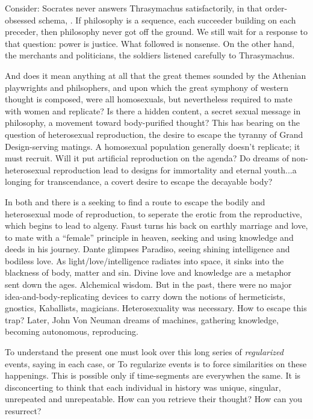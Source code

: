 \documentclass[11pt,twoside,draft]{memoir}
\begin{document}
Consider: Socrates never answers Thrasymachus satisfactorily, in that order-obsessed
schema, . If philosophy is a
sequence, each succeeder building on each
preceder, then philosophy never got off the
ground. We still wait for a response to that
question: power is justice. What followed is
nonsense. On the other hand, the merchants
and politicians, the soldiers listened carefully to Thrasymachus.

And does it mean anything at all that the
great themes sounded by the Athenian playwrights and philsophers, and upon which
the great symphony of western thought is
composed, were all homosexuals, but nevertheless required to mate with women and
replicate? Is there a hidden content, a secret
sexual message in philosophy, a movement
toward body-purified thought? This has
bearing on the question of heterosexual reproduction, the desire to escape the tyranny
of Grand Design-serving matings. A homosexual population generally doesn't replicate; it must recruit. Will it put artificial
reproduction on the agenda? Do dreams of
non-heterosexual reproduction lead to designs for immortality and eternal youth...a
longing for transcendance, a covert desire to
escape the decayable body?

In both  and 
there is a seeking to find a route to escape the
bodily and heterosexual mode of reproduction, to seperate the erotic from the reproductive, which begins to lead to algeny.
Faust turns his back on earthly marriage and
love, to mate with a \enquote{female} principle in
heaven, seeking and using knowledge and
deeds in his journey. Dante glimpses Paradiso, seeing shining intelligence and bodiless love. As light\slash love\slash intelligence radiates into space, it sinks into the blackness of
body, matter and sin. Divine love and knowledge are a metaphor sent down the ages.
Alchemical wisdom. But in the past, there
were no major idea-and-body-replicating
devices to carry down the notions of hermeticists, gnostics, Kaballists, magicians.
Heterosexuality was necessary. How to escape this trap? Later, John Von Neuman
dreams of machines, gathering knowledge,
becoming autonomous, reproducing.

To understand the present one must look
over this long series of \emph{regularized} events,
saying in each case,  or  To
regularize events is to force similarities on
these happenings. This is possible only if
time-segments are everywhen the same. It is
disconcerting to think that each individual
in history was unique, singular, unrepeated
and unrepeatable. How can you retrieve
their thought? How can you resurrect?
\end{document}

